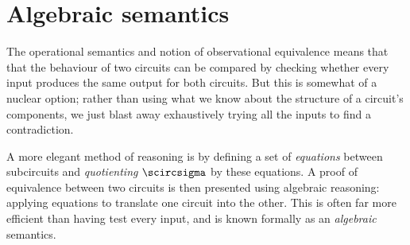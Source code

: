 \chapter{Algebraic semantics}\label{chap:algebraic}

The operational semantics and notion of observational equivalence means that
that the behaviour of two circuits can be compared by checking
whether every input produces the same output for both circuits.
But this is somewhat of a nuclear option; rather than using what we know
about the structure of a circuit's components, we just blast away
exhaustively trying all the inputs to find a contradiction.

A more elegant method of reasoning is by defining a set of \emph{equations}
between subcircuits and \emph{quotienting} \(\scircsigma\) by these equations.
A proof of equivalence between two circuits is then presented using algebraic
reasoning: applying equations to translate one circuit into the other.
This is often far more efficient than having test every input, and is
known formally as an \emph{algebraic} semantics.


